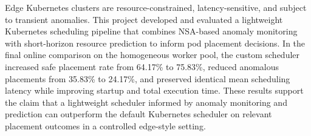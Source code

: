 Edge Kubernetes clusters are resource-constrained, latency-sensitive, and subject to transient anomalies. This project developed and evaluated a lightweight Kubernetes scheduling pipeline that combines NSA-based anomaly monitoring with short-horizon resource prediction to inform pod placement decisions. In the final online comparison on the homogeneous worker pool, the custom scheduler increased safe placement rate from 64.17\% to 75.83\%, reduced anomalous placements from 35.83\% to 24.17\%, and preserved identical mean scheduling latency while improving startup and total execution time. These results support the claim that a lightweight scheduler informed by anomaly monitoring and prediction can outperform the default Kubernetes scheduler on relevant placement outcomes in a controlled edge-style setting.